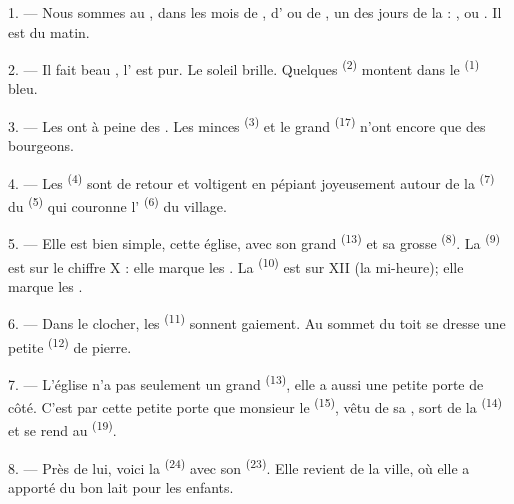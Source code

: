 \VUsaut{2.4mm}

\VUsaut{3.0mm}

1. --- Nous sommes au , dans les mois de ,
d' ou de , un des jours de la  :
,  ou . Il est  du matin.

2. --- Il fait beau , l' est pur. Le soleil brille.
Quelques  \textsuperscript{(2)} montent dans le
 \textsuperscript{(1)} bleu.

3. --- Les  ont à peine des . Les minces
 \textsuperscript{(3)} et le grand 
\textsuperscript{(17)} n'ont encore que des bourgeons.

4. --- Les  \textsuperscript{(4)} sont de retour et
voltigent en pépiant joyeusement autour de la 
\textsuperscript{(7)} du  \textsuperscript{(5)} qui couronne
l' \textsuperscript{(6)} du village.

\VUsaut{3.4mm}
\VUsaut{3.0mm}

5. --- Elle est bien simple, cette église, avec son grand 
\textsuperscript{(13)} et sa grosse  \textsuperscript{(8)}. La
 \textsuperscript{(9)} est sur le chiffre X : elle
marque les . La  \textsuperscript{(10)} est sur
XII (la mi-heure); elle marque les .

6. --- Dans le clocher, les  \textsuperscript{(11)} sonnent
gaiement. Au sommet du toit se dresse une petite 
\textsuperscript{(12)} de pierre.

7. --- L'église n'a pas seulement un grand 
\textsuperscript{(13)}, elle a aussi une petite porte de côté. C'est par cette
petite porte que monsieur le  \textsuperscript{(15)}, vêtu de sa
, sort de la  \textsuperscript{(14)} et se
rend au  \textsuperscript{(19)}.

8. --- Près de lui, voici la  \textsuperscript{(24)} avec son
 \textsuperscript{(23)}. Elle revient de la ville, où elle a
apporté du bon lait pour les enfants.

